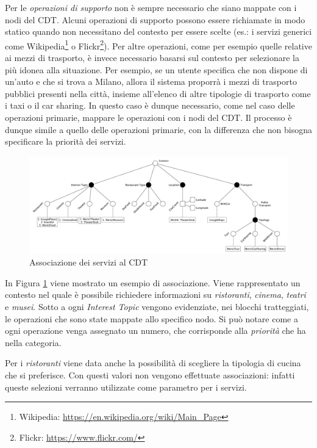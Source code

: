 Per le \emph{operazioni di supporto} non è sempre necessario che siano mappate con i nodi del CDT. Alcuni operazioni di supporto possono essere richiamate in modo statico quando non necessitano del contesto per essere scelte (es.: i servizi generici come Wikipedia\footnote{Wikipedia: \url{https://en.wikipedia.org/wiki/Main_Page}} o Flickr\footnote{Flickr: \url{https://www.flickr.com/}}). Per altre operazioni, come per esempio quelle relative ai mezzi di trasporto, è invece necessario basarsi sul contesto per selezionare la più idonea alla situazione. Per esempio, se un utente specifica che non dispone di un'auto e che si trova a Milano, allora il sistema proporrà i mezzi di trasporto pubblici presenti nella città, insieme all'elenco di altre tipologie di trasporto come i taxi o il car sharing. In questo caso è dunque necessario, come nel caso delle operazioni primarie, mappare le operazioni con i nodi del CDT. Il processo è dunque simile a quello delle operazioni primarie, con la differenza che non bisogna specificare la priorità dei servizi.

\begin{figure}[ht]
	\centering
	\includegraphics[width=\textwidth]{3-metodologia-camus/Immagini/associazioni-cdt.pdf}
	\caption{Associazione dei servizi al CDT}\label{fig:associazione-servizi-cdt}
\end{figure}

In Figura \ref{fig:associazione-servizi-cdt} viene mostrato un esempio di associazione. Viene rappresentato un contesto nel quale è possibile richiedere informazioni su \emph{ristoranti}, \emph{cinema}, \emph{teatri} e \emph{musei}. Sotto a ogni \emph{Interest Topic} vengono evidenziate, nei blocchi tratteggiati, le operazioni che sono state mappate allo specifico nodo. Si può notare come a ogni operazione venga assegnato un numero, che corrisponde alla \emph{priorità} che ha nella categoria.

Per i \emph{ristoranti} viene data anche la possibilità di scegliere la tipologia di cucina che si preferisce. Con questi valori non vengono effettuate associazioni: infatti queste selezioni verranno utilizzate come parametro per i servizi.

